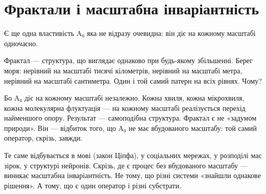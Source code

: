\documentclass[12pt, a4paper, openany]{book}
\begin{document}
\section{Фрактали і масштабна інваріантність}

Є ще одна властивість A₀ яка не відразу очевидна: він діє на кожному масштабі одночасно.

Фрактал — структура, що виглядає однаково при будь-якому збільшенні. Берег моря: нерівний на масштабі тисячі кілометрів, нерівний на масштабі метра, нерівний на масштабі сантиметра. Один і той самий патерн на всіх рівнях. Чому?

Бо A₀ діє на кожному масштабі незалежно. Кожна хвиля, кожна мікрохвиля, кожна молекулярна флуктуація — на кожному масштабі реалізується перехід найменшого опору. Результат — самоподібна структура. Фрактал є не «задумом природи». Він — відбиток того, що A₀ не має вбудованого масштабу: той самий оператор, скрізь, завжди.

Те саме відбувається в мові (закон Ціпфа), у соціальних мережах, у розподілі мас зірок, у структурі нейронів. Скрізь, де є процес без вбудованого масштабу — виникає масштабна інваріантність. Не тому, що різні системи «знайшли однакове рішення». А тому, що є один оператор і різні субстрати.
\end{document}
